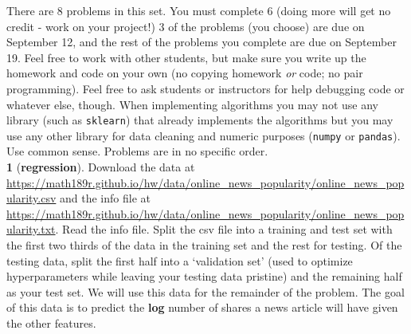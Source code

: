 \documentclass[12pt,letterpaper,fleqn]{hmcpset}
\begin{document}
There are 8 problems in this set. You must complete 6 (doing more will get no
credit - work on your project!) 3 of the problems (you choose) are due on September 12,
and the rest of the problems you complete are due on September 19. Feel
free to work with other students, but make sure you write up the homework
and code on your own (no copying homework \textit{or} code; no pair programming).
Feel free to ask students or instructors for help debugging code or whatever else,
though.
When implementing algorithms you may not use any library (such as \texttt{sklearn})
that already implements the algorithms but you may use any other library for
data cleaning and numeric purposes (\texttt{numpy} or \texttt{pandas}). Use common
sense.
Problems are in no specific order.\\[1em]


\textbf{1} (\textbf{regression}). Download the data at 
\url{https://math189r.github.io/hw/data/online_news_popularity/online_news_popularity.csv}
and the info file at
\url{https://math189r.github.io/hw/data/online_news_popularity/online_news_popularity.txt}.
Read the info file. Split the csv file into a training and test set with
the first two thirds of the data in the training set and the rest for testing.
Of the testing data, split the first half into a `validation set' (used
to optimize hyperparameters while leaving your testing data pristine) and
the remaining half as your test set.
We will use this data for the remainder of the problem. The goal of this data
is to predict the \textbf{log} number of shares a news article will have given the other
features.
\end{document}
